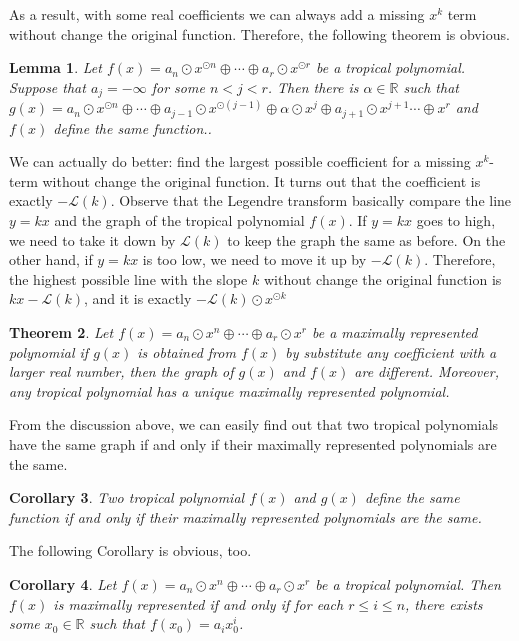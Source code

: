 \documentclass{amsart}
\newtheorem{thm}{Theorem}[section]
\newtheorem{lem}[thm]{Lemma}
\newtheorem{cor}[thm]{Corollary}
\theoremstyle{definition}
\theoremstyle{remark}
\begin{document}
As a result, with some real coefficients we can always add a missing $x^k$ term without change the original function. Therefore, the following theorem is obvious.

\begin{lem}\label{lem:nomissing}
Let $f(x) = a_n {\odot} x^{{\odot} n} {\oplus} \cdots {\oplus} a_r {\odot} x^{{\odot} r}$ be a tropical polynomial. Suppose that $a_j = -\infty$ for some $n < j < r$. Then there is $\alpha \in {\mathbb{R}}$ such that $g(x) = a_n {\odot} x^{{\odot} n} {\oplus} \cdots {\oplus} a_{j-1} {\odot} x^{{\odot}(j-1)} {\oplus} \alpha {\odot} x^j {\oplus} a_{j+1} {\odot} x^{j+1} \cdots {\oplus} x^r$ and $f(x)$ define the same function..
\end{lem}
We can actually do better: find the largest possible coefficient for a missing $x^k$-term without change the original function. It turns out that the coefficient is exactly $-{\mathcal{L}}(k)$. Observe that the Legendre transform basically compare the line $y = kx$ and the graph of the tropical polynomial $f(x)$. If $y = kx$ goes to high, we need to take it down by ${\mathcal{L}}(k)$ to keep the graph the same as before. On the other hand, if $y = kx$ is too low, we need to move it up by $-{\mathcal{L}}(k)$. Therefore, the highest possible line with the slope $k$ without change the original function is $kx - {\mathcal{L}}(k)$, and it is exactly $-{\mathcal{L}}(k) {\odot} x^{{\odot} k}$
\begin{thm}
Let $f(x) = a_n {\odot} x^n {\oplus} \cdots {\oplus} a_r {\odot} x^r$ be a maximally represented polynomial if $g(x)$ is obtained from $f(x)$ by substitute any coefficient with a larger real number, then the graph of $g(x)$ and $f(x)$ are different. Moreover, any tropical polynomial has a unique maximally represented polynomial. 
\end{thm}
From the discussion above, we can easily find out that two tropical polynomials have the same graph if and only if their maximally represented polynomials are the same.
\begin{cor}
 Two tropical polynomial $f(x)$ and $g(x)$ define the same function if and only if their maximally represented polynomials are the same.
\end{cor}

The following Corollary is obvious, too.

\begin{cor}
Let $f(x) = a_n {\odot} x^n {\oplus} \cdots {\oplus} a_r {\odot} x^r$ be a tropical polynomial. Then $f(x)$ is maximally represented if and only if 
for each $r \leq i \leq n$, there exists some $x_0 \in {\mathbb{R}}$ such that $f(x_0) = a_i x_0^i$.
\end{cor}
\end{document}
